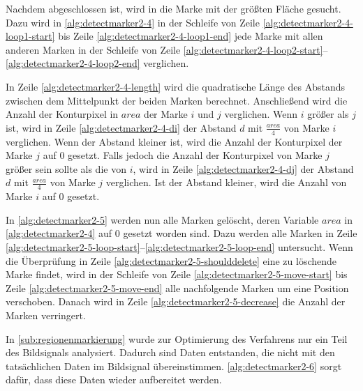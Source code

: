 Nachdem  abgeschlossen ist, wird in  die Marke mit der größten Fläche
 gesucht. Dazu wird in \autoref{alg:detectmarker2-4} in der Schleife von Zeile \ref{alg:detectmarker2-4-loop1-start}
 bis Zeile \ref{alg:detectmarker2-4-loop1-end} jede Marke mit allen anderen Marken in der Schleife von Zeile
 \ref{alg:detectmarker2-4-loop2-start}--\ref{alg:detectmarker2-4-loop2-end} verglichen.



In Zeile \ref{alg:detectmarker2-4-length} wird die quadratische Länge des Abstands zwischen dem Mittelpunkt der beiden
 Marken berechnet. Anschließend wird die Anzahl der Konturpixel in $\mathit{area}$ der Marke $i$ und $j$ verglichen.
 Wenn $i$ größer als $j$ ist, wird in Zeile \ref{alg:detectmarker2-4-di} der Abstand $d$ mit $\frac{\mathit{area}}{4}$
 von Marke $i$ verglichen. Wenn der Abstand kleiner ist, wird die Anzahl der Konturpixel der Marke $j$ auf $0$ gesetzt.
 Falls jedoch die Anzahl der Konturpixel von Marke $j$ größer sein sollte als die von $i$, wird in Zeile
 \ref{alg:detectmarker2-4-dj} der Abstand $d$ mit $\frac{\mathit{area}}{4}$ von Marke $j$ verglichen. Ist der Abstand
 kleiner, wird die Anzahl von Marke $i$ auf $0$ gesetzt.

In \autoref{alg:detectmarker2-5} werden nun alle Marken gelöscht, deren Variable $\mathit{area}$ in
 \autoref{alg:detectmarker2-4} auf $0$ gesetzt worden sind. Dazu werden alle Marken in Zeile
 \ref{alg:detectmarker2-5-loop-start}--\ref{alg:detectmarker2-5-loop-end} untersucht. Wenn die Überprüfung in Zeile
 \ref{alg:detectmarker2-5-shoulddelete} eine zu löschende Marke findet, wird in der Schleife von Zeile
 \ref{alg:detectmarker2-5-move-start} bis Zeile \ref{alg:detectmarker2-5-move-end} alle nachfolgende Marken um eine
 Position verschoben. Danach wird in Zeile \ref{alg:detectmarker2-5-decrease} die Anzahl der Marken verringert.



In \autoref{sub:regionenmarkierung} wurde zur Optimierung des Verfahrens nur ein Teil des Bildsignals analysiert.
 Dadurch sind Daten entstanden, die nicht mit den tatsächlichen Daten im Bildsignal übereinstimmen.
 \autoref{alg:detectmarker2-6} sorgt dafür, dass diese Daten wieder aufbereitet werden.



